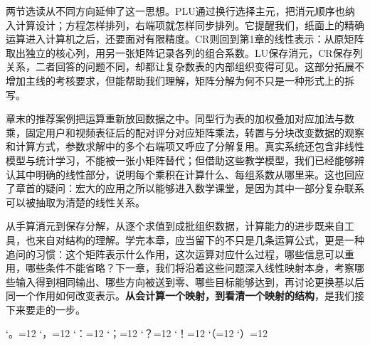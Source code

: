 \documentclass[a4paper,12pt,twoside,openany,fontset=none]{ctexbook}
\numberwithin{equation}{chapter}
\begin{document}
两节选读从不同方向延伸了这一思想。PLU通过换行选择主元，把消元顺序也纳入计算设计；方程怎样排列，右端项就怎样同步排列。它提醒我们，纸面上的精确运算进入计算机之后，还要面对有限精度。CR则回到第1章的线性表示：从原矩阵取出独立的核心列，用另一张矩阵记录各列的组合系数。LU保存消元，CR保存列关系，二者回答的问题不同，却都让复杂数表的内部组织变得可见。这部分拓展不增加主线的考核要求，但能帮助我们理解，矩阵分解为何不只是一种形式上的拆写。

章末的推荐案例把运算重新放回数据之中。同型行为表的加权叠加对应加法与数乘，固定用户和视频表征后的配对评分对应矩阵乘法，转置与分块改变数据的观察和计算方式，参数求解中的多个右端项又呼应了分解复用。真实系统还包含非线性模型与统计学习，不能被一张小矩阵替代；但借助这些教学模型，我们已经能够辨认其中明确的线性部分，说明每个乘积在计算什么、每组系数从哪里来。这也回应了章首的疑问：宏大的应用之所以能够进入数学课堂，是因为其中一部分复杂联系可以被抽取为清楚的线性关系。

从手算消元到保存分解，从逐个求值到成批组织数据，计算能力的进步既来自工具，也来自对结构的理解。学完本章，应当留下的不只是几条运算公式，更是一种追问的习惯：这个矩阵表示什么作用，这次运算对应什么过程，哪些信息可以重用，哪些条件不能省略？下一章，我们将沿着这些问题深入线性映射本身，考察哪些输入得到相同输出、哪些方向被送到零、哪些目标能够达到，再讨论更换基以后同一个作用如何改变表示。\textbf{从会计算一个映射，到看清一个映射的结构}，是我们接下来要走的一步。
\par\clearpage
\endgroup


\par\clearpage
\endgroup

\begingroup
\catcode`。=12 \catcode`，=12 \catcode`：=12 \catcode`；=12
\catcode`？=12 \catcode`！=12 \catcode`（=12 \catcode`）=12
\end{document}
